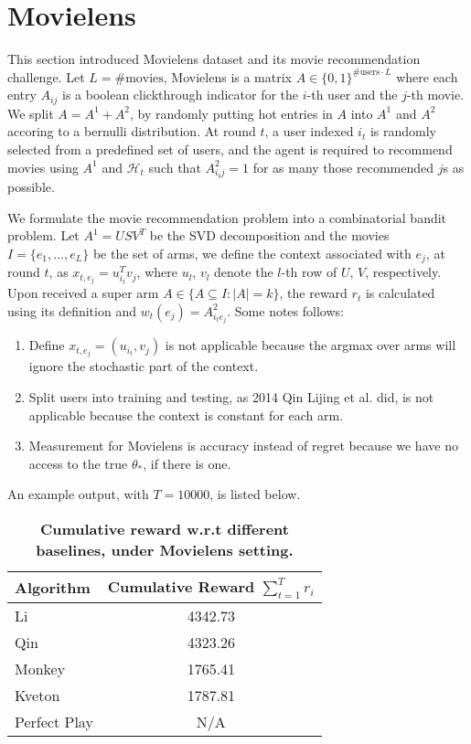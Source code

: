\documentclass[a4paper,11pt]{article}
\begin{document}
\section{Movielens}

This section introduced Movielens dataset and its movie recommendation challenge. Let $L=\#\text{movies}$, Movielens is a matrix $A\in \{0,1\}^{\#\text{users}\cdot L}$ where each entry $A_{ij}$ is a boolean clickthrough indicator for the $i$-th user and the $j$-th movie. We split $A=A^1+A^2$, by randomly putting hot entries in $A$ into $A^1$ and $A^2$ accoring to a bernulli distribution. At round $t$, a user indexed $i_t$ is randomly selected from a predefined set of users, and the agent is required to recommend movies using $A^1$ and $\mathcal{H}_t$ such that $A^2_{i_tj}=1$ for as many those recommended $j$s as possible.

We formulate the movie recommendation problem into a combinatorial bandit problem. Let $A^1=USV^T$ be the SVD decomposition and the movies $I=\{e_1,\dots,e_L\}$ be the set of arms, we define the context associated with $e_j$, at round $t$, as $x_{t,e_j}=u_{i_t}^Tv_j$, where $u_l$, $v_l$ denote the $l$-th row of $U$, $V$, respectively. Upon received a super arm $A\in \{A\subseteq I: |A|=k\}$, the reward $r_t$ is calculated using its definition and $w_t(e_j)=A^2_{i_te_j}$. Some notes follows:

\begin{enumerate}

  \item Define $x_{t,e_j}=(u_{i_t}, v_j)$ is not applicable because the argmax over arms will ignore the stochastic part of the context.

  \item Split users into training and testing, as 2014 Qin Lijing et al. did, is not applicable because the context is constant for each arm.

  \item Measurement for Movielens is accuracy instead of regret because we have no access to the true $\theta_\ast$, if there is one.

\end{enumerate}

An example output, with $T=10000$, is listed below.

\begin{table}
    \centering
    \renewcommand{\arraystretch}{1.2}
	\begin{tabular}{lc}
	    \toprule
		\textbf{Algorithm}  &\textbf{Cumulative Reward $\sum_{t=1}^Tr_i $}\\
		\midrule
		Li		    &4342.73 \\
		Qin		    &4323.26 \\
		Monkey		    &1765.41 \\
		Kveton		    &1787.81 \\
		Perfect Play		    &N/A \\
		\bottomrule
	\end{tabular}
	\caption{\textbf{Cumulative reward w.r.t different baselines, under Movielens setting.}}
	\label{daily}
\end{table}
\end{document}
